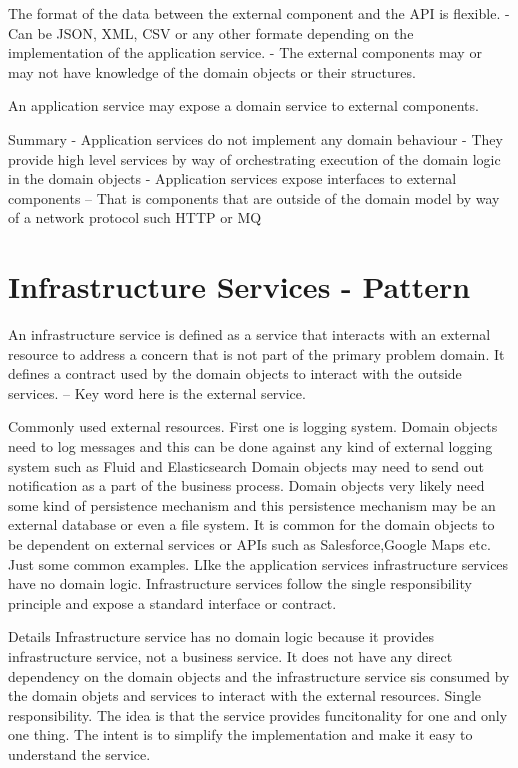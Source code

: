 The format of the data between the external component and the API is flexible.
- Can be JSON, XML, CSV or any other formate depending on the implementation of the application service.
- The external components may or may not have knowledge of the domain objects or their structures.

An application service may expose a domain service to external components.

Summary
- Application services do not implement any domain behaviour
- They provide high level services by way of orchestrating execution of the domain logic in the domain objects
- Application services expose interfaces to external components
-- That is components that are outside of the domain model by way of a network protocol such HTTP or MQ

\section{Infrastructure Services - Pattern}
An infrastructure service is defined as a service that interacts with an external resource to address a concern that is not part of the primary problem domain.
It defines a contract used by the domain objects to interact with the outside services.
-- Key word here is the external service.

Commonly used external resources.
First one is logging system.
Domain objects need to log messages and this can be done against any kind of external logging system such as Fluid and Elasticsearch
Domain objects may need to send out notification as a part of the business process.
Domain objects very likely need some kind of persistence mechanism and this persistence mechanism may be an external database or even a file system.
It is common for the domain objects to be dependent on external services or APIs such as Salesforce,Google Maps etc. Just some common examples.
LIke the application services infrastructure services have no domain logic.
Infrastructure services follow the single responsibility principle and expose a standard interface or contract.

Details
Infrastructure service has no domain logic because it provides infrastructure service, not a business service.
It does not have any direct dependency on the domain objects and the infrastructure service sis consumed by the domain objets and services to interact with the external resources.
Single responsibility. The idea is that the service provides funcitonality for one and only one thing.
The intent is to simplify the implementation and make it easy to understand the service.

